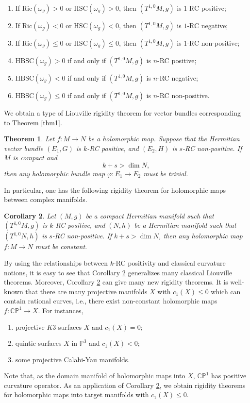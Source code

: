 \documentclass[12pt]{amsart}
\theoremstyle{plain}
\newtheorem{thm}{Theorem}[section]
\newtheorem{cor}[thm]{Corollary}
\theoremstyle{definition}
\newcommand{\btheorem}{\begin{thm}}
\newcommand{\etheorem}{\end{thm}}
\newcommand{\bcorollary}{\begin{cor}}
\newcommand{\ecorollary}{\end{cor}}
\renewcommand{\phi}{\varphi}
\newcommand{\bd}{\begin{enumerate}}
\newcommand{\ed}{\end{enumerate}}
\renewcommand{\>}{\rightarrow}
\newcommand{\C}{{\mathbb C}}
\renewcommand{\P}{{\mathbb P}}
\numberwithin{equation}{section} %
\begin{document}
\bd
\item  If  $\mathrm{Ric}(\omega_g)>0$ or $\mathrm{HSC}(\omega_g)>0$, then $(T^{1,0}M, g)$ is $1$-RC positive;
\item   If  $\mathrm{Ric}(\omega_g)<0$ or $\mathrm{HSC}(\omega_g)<0$, then $(T^{1,0}M, g)$ is $1$-RC negative;
\item  If  $\mathrm{Ric}(\omega_g)\leq 0$ or $\mathrm{HSC}(\omega_g)\leq 0$, then $(T^{1,0}M, g)$ is $1$-RC non-positive;
\item  $\mathrm{HBSC}(\omega_g)>0$ if and only if $(T^{1,0}M, g)$ is $n$-RC positive;
\item  $\mathrm{HBSC}(\omega_g)<0$ if and only if $(T^{1,0}M, g)$ is $n$-RC negative;
\item  $\mathrm{HBSC}(\omega_g)\leq 0$ if and only if $(T^{1,0}M, g)$ is $n$-RC non-positive.
\ed

\noindent
We obtain a type of  Liouville  rigidity theorem for vector bundles corresponding to Theorem \ref{thm1}.

\btheorem\label{RC positive rigidity} Let $f:M\>N$ be a holomorphic map.  Suppose that the Hermitian vector bundle
$(E_1,G)$ is $k$-RC positive,  and $(E_2,H)$ is $s$-RC non-positive.  If $M$ is compact and  $$k+s>\dim N,$$  then any  holomorphic bundle map $\phi:E_1\>E_2$ must be trivial.
\etheorem


\baselineskip

\noindent In particular, one has the following rigidity theorem for holomorphic maps between complex manifolds.

\bcorollary\label{RCpositive and RCnegative}
Let $(M,g)$ be a compact Hermitian manifold such that $(T^{1,0}M,g)$ is $k$-RC positive,
and $(N,h)$ be a Hermitian manifold such that $(T^{1,0}N,h)$ is $s$-RC non-positive.
If $k+s>\dim N$, then any holomorphic map $f:M\to N$ must be constant.
\ecorollary


\noindent By using the relationships between $k$-RC positivity and classical curvature notions, it is easy to see that  Corollary \ref{RCpositive and RCnegative} generalizes many classical Liouville theorems.  Moreover, Corollary \ref{RCpositive and RCnegative} can give   many new  rigidity theorems.   It is well-known that there are many projective manifolds $X$ with $c_1(X)\leq 0$ which can  contain rational curves, i.e., there exist non-constant holomorphic maps $f:\C\P^1\>X$. For instances,
\bd \item  projective $K3$ surfaces $X$ and $c_1(X)=0$;
\item  quintic surfaces $X$ in $\P^3$ and $c_1(X)<0$;
\item some projective Calabi-Yau manifolds.
\ed
Note that,  as the domain manifold of holomorphic maps into $X$, $\C\P^1$ has positive curvature operator.
As an application of Corollary \ref{RCpositive and RCnegative}, we obtain rigidity theorems for holomorphic maps  into  target manifolds with $c_1(X)\leq 0$.
\end{document}
